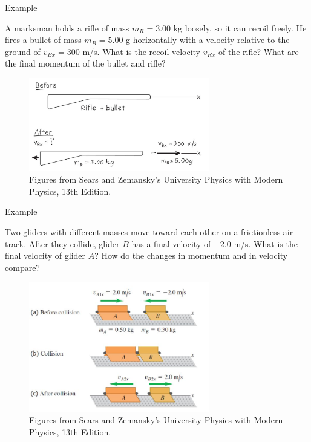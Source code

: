 \documentclass[]{beamer}
\begin{document}

\begin{frame}
Example
\vspace{3mm}

A marksman holds a rifle of mass $m_R=3.00$ kg loosely, so it can
recoil freely. He fires a bullet of mass $m_B=5.00$ g horizontally
with a velocity relative to the ground of $v_{Bx}=300$ m/s. What is
the recoil velocity $v_{Rx}$ of the rifle? What are the final momentum
 of the bullet and rifle?



 \begin{figure}[h!]  
    \includegraphics[width=0.7\textwidth]{images/5.jpg}
    \caption{ {\tiny Figures from Sears and Zemansky's University Physics 
    with Modern Physics, 13th Edition.} }
  \end{figure}


\end{frame}




\begin{frame}
    Example
    \vspace{3mm}
    
    Two gliders with different masses move toward each other on a
    frictionless air track. After they collide,
    glider $B$ has a final velocity of $+2.0$ m/s. What is the
    final velocity of glider $A$? How do the changes in momentum and
    in velocity compare?
    
    
    
     \begin{figure}[h!]  
        \includegraphics[width=0.7\textwidth]{images/6.jpg}
        \caption{ {\tiny Figures from Sears and Zemansky's University Physics 
        with Modern Physics, 13th Edition.} }
      \end{figure}
    
    
    \end{frame}
\end{document}

